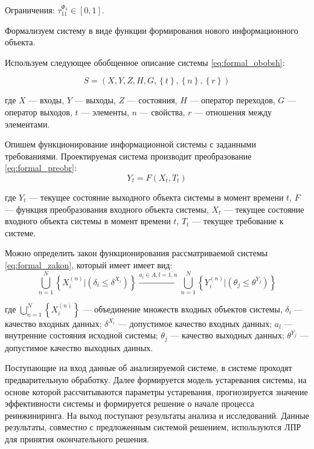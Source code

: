 Ограничения: $\tau^{\Phi_4}_{11} \in [0,1]$.

Формализуем систему в виде функции формирования нового информационного объекта.

Используем следующее обобщенное описание системы \ref{eq:formal_obobsh}: 

\begin{equation}
    \label{eq:formal_obobsh}
    S=(X,Y,Z,H,G, \left\{ t \right\}, \left\{ n \right\}, \left\{ r \right\} )
\end{equation}
\vspace{\baselineskip}

\noindent
где $X$ --- входы,
$Y$ --- выходы,
$Z$ --- состояния,
$H$ --- оператор переходов,
$G$ --- оператор выходов,
$t$ --- элементы,
$n$ --- свойства,
$r$ --- отношения между элементами.

Опишем функционирование информационной системы с заданными требованиями. 
Проектируемая система производит преобразование \ref{eq:formal_preobr}:
\begin{equation}
    \label{eq:formal_preobr}
    Y_t=F(X_t,T_t)
\end{equation} 
\vspace{\baselineskip}

\noindent
где $Y_t$ --- текущее состояние выходного объекта системы в момент времени $t$,
$F$ --- функция преобразования входного объекта системы,
$X_t$ --- текущее состояние входного объекта системы в момент времени $t$,
$T_t$ --- текущее требование к системе.

Можно определить закон функционирования рассматриваемой системы \ref{eq:formal_zakon}, который имеет имеет вид: 
\begin{equation}
    \label{eq:formal_zakon}
    \bigcup_{n=1}^N \left\{ X_i^{(n)} | (\delta_i \leq \delta^{X_i}) \right\}
    \xrightarrow{a_i \in A, l=\overline{1,n}}
    \bigcup_{n=1}^N \left\{ Y_i^{(n)} | (\theta_j \leq \theta^{Y_j}) \right\}
\end{equation} 
\vspace{\baselineskip}

\noindent
где $\bigcup_{n=1}^N \left\{ X_i^{(n)} \right\}$ --- объединение множеств входных объектов системы,
$\delta_i$ --- качество входных данных;
$\delta^{X_i}$ --- допустимое качество входных данных; 
$a_l$ --- внутренние состояния исходной системы; 
$\theta_j$ --- качество выходных данных;
$\theta^{Y_j}$ --- допустимое качество выходных данных. 

Поступающие на вход данные об анализируемой системе, в системе проходят предварительную обработку. 
Далее формируется модель устаревания системы, на основе которой рассчитываются параметры устаревания, прогнозируется значение эффективности системы и формируется решение о начале процесса реинжиниринга. 
На выход поступают результаты анализа и исследований. 
Данные результаты, совместно с предложенным системой решением, используются ЛПР для принятия окончательного решения.

